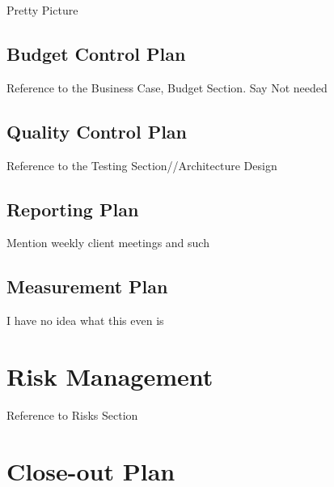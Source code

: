 Pretty Picture


\subsection{Budget Control Plan}

Reference to the Business Case, Budget Section. Say Not needed


\subsection{Quality Control Plan}

Reference to the Testing Section//Architecture Design


\subsection{Reporting Plan}

Mention weekly client meetings and such


\subsection{Measurement Plan}

I have no idea what this even is


\section{Risk Management}

	Reference to Risks Section



\section{Close-out Plan}

